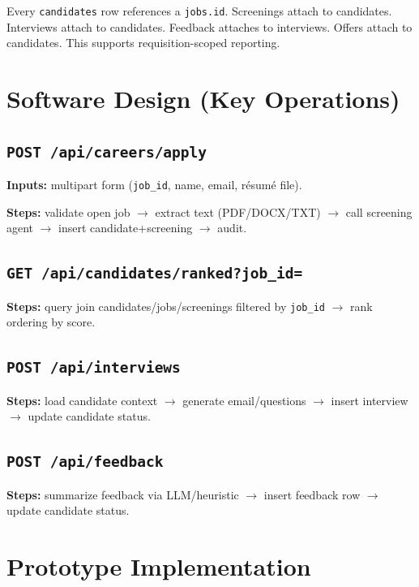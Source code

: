 \documentclass[12pt]{article}
\begin{document}
Every \texttt{candidates} row references a \texttt{jobs.id}. Screenings attach to candidates. Interviews attach to candidates. Feedback attaches to interviews. Offers attach to candidates. This supports requisition-scoped reporting.

\section{Software Design (Key Operations)}

\subsection{\texttt{POST /api/careers/apply}}

\textbf{Inputs:} multipart form (\texttt{job\_id}, name, email, résumé file).

\textbf{Steps:} validate open job $\rightarrow$ extract text (PDF/DOCX/TXT) $\rightarrow$ call screening agent $\rightarrow$ insert candidate+screening $\rightarrow$ audit.

\subsection{\texttt{GET /api/candidates/ranked?job\_id=}}

\textbf{Steps:} query join candidates/jobs/screenings filtered by \texttt{job\_id} $\rightarrow$ rank ordering by score.

\subsection{\texttt{POST /api/interviews}}

\textbf{Steps:} load candidate context $\rightarrow$ generate email/questions $\rightarrow$ insert interview $\rightarrow$ update candidate status.

\subsection{\texttt{POST /api/feedback}}

\textbf{Steps:} summarize feedback via LLM/heuristic $\rightarrow$ insert feedback row $\rightarrow$ update candidate status.

\section{Prototype Implementation}
\label{sec:prototype}
\end{document}
